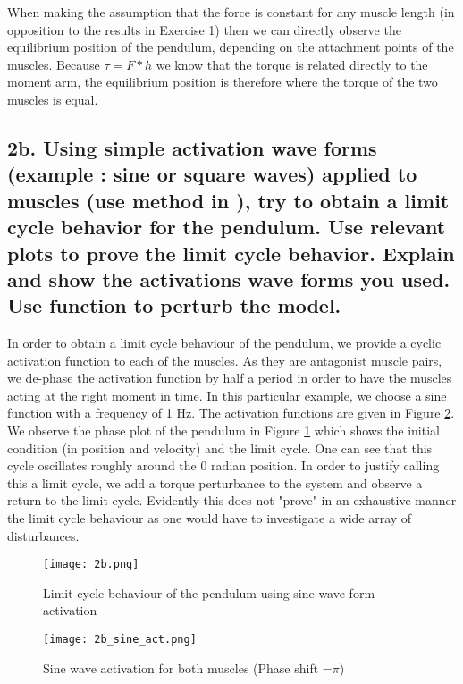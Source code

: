 \documentclass[11pt]{article}
\begin{document}
When making the assumption that the force is constant for any muscle length (in opposition to the results in Exercise 1) then we can directly observe the equilibrium position of the pendulum, depending on the attachment points of the muscles. Because \(\tau=F*h\) we know that the torque is related directly to the moment arm, the equilibrium position is therefore where the torque of the two muscles is equal. 


\subsection*{2b. Using simple activation wave forms (example : sine or
  square waves) applied to muscles (use
   method in
  ), try to obtain a limit cycle behavior for
  the pendulum. Use relevant plots to prove the limit cycle behavior.
  Explain and show the activations wave forms you used. Use
  \newline {} function to perturb the model.}
  
In order to obtain a limit cycle behaviour of the pendulum, we provide a cyclic activation function to each of the muscles. As they are antagonist muscle pairs, we de-phase the activation function by half a period in order to have the muscles acting at the right moment in time. In this particular example, we choose a sine function with a frequency of 1 Hz. The activation functions are given in Figure \ref{fig:sinwavelimit2}. We observe the phase plot of the pendulum in Figure \ref{fig:sinwavelimit1} which shows the initial condition (in position and velocity) and the limit cycle. One can see that this cycle oscillates roughly around the 0 radian position. In order to justify calling this a limit cycle, we add a torque perturbance to the system and observe a return to the limit cycle. Evidently this does not "prove" in an exhaustive manner the limit cycle behaviour as one would have to investigate a wide array of disturbances. 
  
  
 \begin{figure}[!h]
\centering
\texttt{[image: 2b.png]}

\caption{Limit cycle behaviour of the pendulum using sine wave form activation}
\label{fig:sinwavelimit1}
\end{figure}
 
 \begin{figure}[!h]
\centering
\texttt{[image: 2b\_sine\_act.png]}

\caption{Sine wave activation for both muscles (Phase shift =$\pi$)}
\label{fig:sinwavelimit2}
\end{figure}
  
\end{document}
